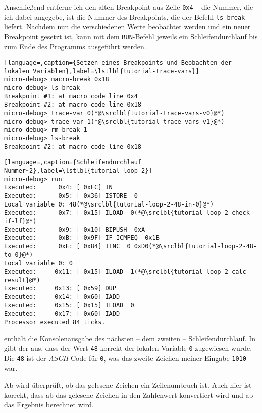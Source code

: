 Anschließend entferne ich den alten Breakpoint aus Zeile \texttt{0x4} -- die Nummer, die ich dabei angegebe, ist die Nummer des Breakpoints, die der Befehl \texttt{ls-break} liefert. Nachdem nun die verschiedenen Werte beobachtet werden und ein neuer Breakpoint gesetzt ist, kann mit dem \texttt{RUN}-Befehl jeweils ein Schleifendurchlauf bis zum Ende des Programms ausgeführt werden.

\begin{lstlisting}[language=,caption={Setzen eines Breakpoints und Beobachten der lokalen Variablen},label=\lstlbl{tutorial-trace-vars}]
micro-debug> macro-break 0x18
micro-debug> ls-break
Breakpoint #1: at macro code line 0x4
Breakpoint #2: at macro code line 0x18
micro-debug> trace-var 0(*@\srclbl{tutorial-trace-vars-v0}@*)
micro-debug> trace-var 1(*@\srclbl{tutorial-trace-vars-v1}@*)
micro-debug> rm-break 1
micro-debug> ls-break
Breakpoint #2: at macro code line 0x18
\end{lstlisting}

\begin{lstlisting}[language=,caption={Schleifendurchlauf Nummer~2},label=\lstlbl{tutorial-loop-2}]
micro-debug> run
Executed:      0x4: [ 0xFC] IN 
Executed:      0x5: [ 0x36] ISTORE  0
Local variable 0: 48(*@\srclbl{tutorial-loop-2-48-in-0}@*)
Executed:      0x7: [ 0x15] ILOAD  0(*@\srclbl{tutorial-loop-2-check-if-lf}@*)
Executed:      0x9: [ 0x10] BIPUSH  0xA
Executed:      0xB: [ 0x9F] IF_ICMPEQ  0x1B
Executed:      0xE: [ 0x84] IINC  0 0xD0(*@\srclbl{tutorial-loop-2-48-to-0}@*)
Local variable 0: 0
Executed:     0x11: [ 0x15] ILOAD  1(*@\srclbl{tutorial-loop-2-calc-result}@*)
Executed:     0x13: [ 0x59] DUP 
Executed:     0x14: [ 0x60] IADD 
Executed:     0x15: [ 0x15] ILOAD  0
Executed:     0x17: [ 0x60] IADD 
Processor executed 84 ticks.
\end{lstlisting}

 enthält die Konsolenausgabe des nächsten -- dem zweiten -- Schleifendurchlauf. In  gibt der \md aus, dass der Wert \texttt{48} korrekt der lokalen Variable \texttt{0} zugewiesen wurde. Die \texttt{48} ist der \emph{ASCII}-Code für \texttt{0}, was das zweite Zeichen meiner Eingabe \texttt{1010} war.

Ab  wird überprüft, ob das gelesene Zeichen ein Zeilenumbruch ist. Auch hier ist korrekt, dass ab  das gelesene Zeichen in den Zahlenwert konvertiert wird und ab  das Ergebnis berechnet wird.

